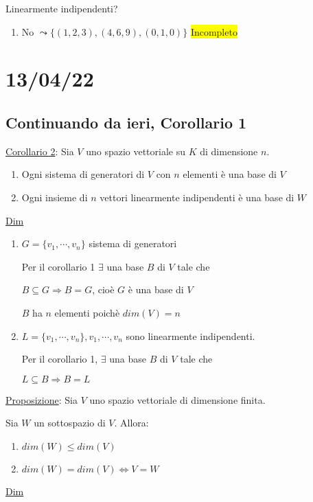 \documentclass{article}
\newcommand{\hl}[1]{\colorbox{yellow}{#1}}
\newcommand{\ul}[1]{\underline{#1}}
\begin{document}
	Linearmente indipendenti?
	\begin{enumerate}
		\item No $\leadsto\{(1,2,3),(4,6,9),(0,1,0)\}$ \hl{Incompleto}
	\end{enumerate}
	\section{13/04/22}
	\subsection{Continuando da ieri, Corollario 1}
	\ul{Corollario 2}: Sia $V$ uno spazio vettoriale su $K$ di dimensione $n$.
	\begin{enumerate}
		\item Ogni sistema di generatori di $V$ con $n$ elementi è una base di $V$
		\item Ogni insieme di $n$ vettori linearmente indipendenti è una base di $W$
	\end{enumerate}

	\ul{Dim}
	\begin{enumerate}
		\item $G=\{v_1,\cdots,v_n\}$ sistema di generatori

		      Per il corollario 1 $\exists$ una base $B$ di $V$ tale che

		      $B\subseteq G\Rightarrow B=G$, cioè $G$ è una base di $V$

		      $B$ ha $n$ elementi poichè $dim(V)=n$
		\item $L=\{v_1,\cdots,v_n\},v_1,\cdots,v_n$ sono linearmente indipendenti.

		      Per il corollario 1, $\exists$ una base $B$ di $V$ tale che

		      $L\subseteq B\Rightarrow B=L$
	\end{enumerate}

	\ul{Proposizione}: Sia $V$ uno spazio vettoriale di dimensione finita.

	Sia $W$ un sottospazio di $V$. Allora:
	\begin{enumerate}
		\item $dim(W)\le dim(V)$
		\item $dim(W)=dim(V)\Leftrightarrow V=W$
	\end{enumerate}

	\ul{Dim}
\end{document}
